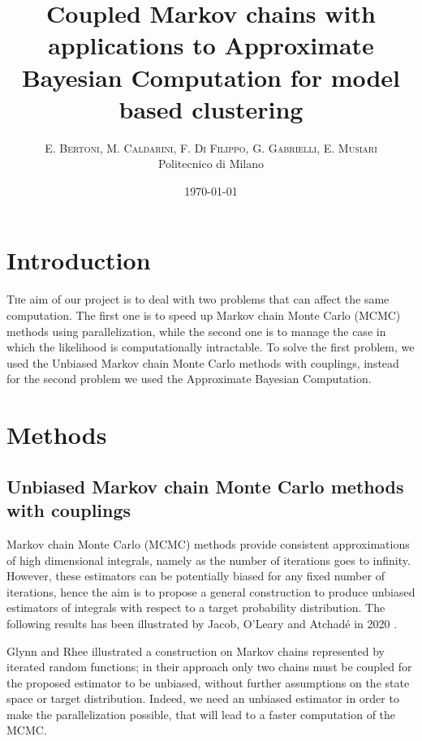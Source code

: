 \documentclass {article}
\title{Coupled Markov chains with applications to Approximate Bayesian Computation for model based clustering} %
\author{%
\textsc{E. Bertoni, M. Caldarini, F. Di Filippo, G. Gabrielli, E. Musiari} \\[1ex] %
\normalsize Politecnico di Milano \\ %
}
\date{\today} %
\begin{document}
\maketitle


\section{Introduction}

\lettrine[nindent=0em,lines=3]{T}he aim of our project is to deal with two problems that can affect the same computation. The first one is to speed up Markov chain Monte Carlo (MCMC) methods using parallelization, while the second one is to manage the case in which the likelihood is computationally intractable. To solve the first problem, we used the Unbiased Markov chain Monte Carlo methods with couplings, instead for the second problem we used the Approximate Bayesian Computation.


\section{Methods}

%

\subsection{Unbiased Markov chain Monte Carlo methods with couplings}


Markov chain Monte Carlo (MCMC) methods provide consistent approximations of high dimensional integrals, namely as the number of iterations goes to infinity. However, these estimators can be potentially biased for any fixed number of iterations, hence the aim is to propose a general construction to produce unbiased estimators of integrals with respect to a target probability distribution. 
The following results has been illustrated by Jacob, O'Leary and Atchadé in 2020 \cite{jacob2020}.

Glynn and Rhee \cite{glynn2014exact} illustrated a construction on Markov chains represented by iterated random functions; in their approach only two chains must be coupled for the proposed estimator to be unbiased, without further assumptions on the state space or target distribution. 
Indeed, we need an unbiased estimator in order to make the parallelization possible, that will lead to a faster computation of the MCMC.
\end{document}
